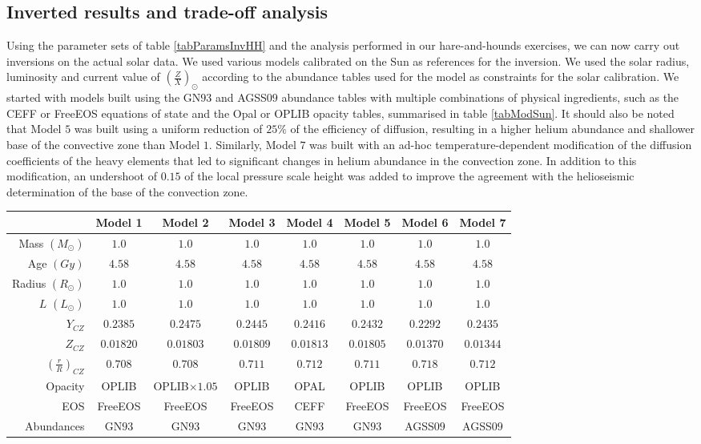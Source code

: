 \documentclass[a4paper,fleqn,usenatbib]{mnras}
\begin{document}
\subsection{Inverted results and trade-off analysis} \label{sec:sunRes}
Using the parameter sets of table \ref{tabParamsInvHH} and the analysis performed in our hare-and-hounds exercises, we can now carry out inversions on the actual solar data. We used various models calibrated on the Sun as references for the inversion. We used the solar radius, luminosity and current value of $\left(\frac{Z}{X}\right)_{\odot}$ according to the abundance tables used for the model as constraints for the solar calibration. We started with models built using the GN$93$ and AGSS$09$ abundance tables with multiple combinations of physical ingredients, such as the CEFF or FreeEOS equations of state and the Opal \cite{Opal} or OPLIB \citet{Colgan} opacity tables, summarised in table \ref{tabModSun}. It should also be noted that Model $5$ was built using a uniform reduction of $25\%$ of the efficiency of diffusion, resulting in a higher helium abundance and shallower base of the convective zone than Model $1$. Similarly, Model $7$ was built with an ad-hoc temperature-dependent modification of the diffusion coefficients of the heavy elements that led to significant changes in helium abundance in the convection zone. In addition to this modification, an undershoot of $0.15$ of the local pressure scale height was added to improve the agreement with the helioseismic determination of the base of the convection zone.
\begin{table*}
\caption{Properties of the solar models used for the inversion.}
\label{tabModSun}
  \centering
\begin{tabular}{r | c | c | c | c | c | c | c}
\hline 
& Model 1  & Model 2 & Model 3 & Model 4 & Model 5 & Model 6 & Model 7 \\ \hline
Mass $(M_{\odot})$ & $1.0$ & $1.0$ & $1.0$ & $1.0$ & $1.0$ & $1.0$ & $1.0$\\  
Age $(Gy)$ & $4.58$&  $4.58$ & $4.58$& $4.58$& $4.58$ &$4.58$& $4.58$\\  
Radius $(R_{\odot})$& $1.0$& $1.0$ & $1.0$& $1.0$ & $1.0$ & $1.0$& $1.0$\\
$L$ $(L_{\odot})$ & $1.0$ & $1.0$ & $1.0$ & $1.0$ & $1.0$ & $1.0$ & $1.0$\\
$Y_{CZ}$ & $0.2385$ & $0.2475$ & $0.2445$ & $0.2416$ &$0.2432$&$0.2292$&$0.2435$\\
$Z_{CZ}$ & $0.01820$ & $0.01803$ &$0.01809$ & $0.01813$ & $0.01805$ &$0.01370$&$0.01344$\\
$\left(\frac{r}{R}\right)_{CZ}$ & $0.708$ & $0.708$ &$0.711$ & $0.712$ &$0.711$ &$0.718$& $0.712$\\
Opacity &OPLIB& OPLIB$\times 1.05$& OPLIB & OPAL &OPLIB &OPLIB & OPLIB \\
EOS & FreeEOS & FreeEOS & FreeEOS & CEFF & FreeEOS & FreeEOS & FreeEOS \\
Abundances & GN$93$ & GN$93$ & GN$93$ & GN$93$ & GN$93$ & AGSS$09$ & AGSS$09$ \\
\hline
\end{tabular}
\end{table*}
\end{document}
